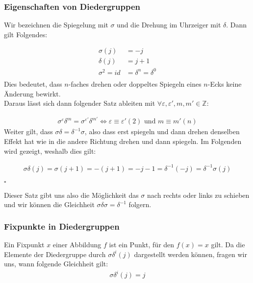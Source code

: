 \documentclass[12pt, german]{article}
\newcommand{\bewiesen}{
	
	\begin{flushright}
		$\square$  \\
\end{flushright}}
\begin{document}
\subsubsection{Eigenschaften von Diedergruppen}
	\label{sec:diederEigenschaften}
	Wir bezeichnen die Spiegelung mit $\sigma$ und die Drehung im Uhrzeiger mit $\delta$. Dann gilt Folgendes:
	
	\begin{align*}
		\sigma(j)&=-j\\
		\delta(j)&=j+1\\
		\sigma^2 = id &= \delta^n = \delta^0 \\ 	 
	\end{align*}
	Dies bedeutet, dass $n$-faches drehen oder doppeltes Spiegeln eines  $n$-Ecks keine Änderung bewirkt.  \\
	Daraus lässt sich dann folgender Satz ableiten mit $\forall \varepsilon, \varepsilon', m, m' \in \mathbb{Z}$: 
	
	\begin{align*}
		\sigma^\varepsilon\delta^m = \sigma^{\varepsilon'}\delta^{m'} \iff \varepsilon \equiv \varepsilon' (2) \text{ und } m \equiv m' (n)
	\end{align*}
	Weiter gilt, dass $\sigma\delta = \delta^{-1}\sigma$, also dass erst spiegeln und dann drehen denselben Effekt hat wie in die andere Richtung drehen und dann spiegeln. Im Folgenden wird gezeigt, weshalb dies gilt:
	
	\begin{align*}
		\sigma \delta(j) = \sigma(j+1) = -(j + 1) = -j -1 = \delta^{-1}(-j)=\delta^{-1}\sigma(j)
	\end{align*}
	\bewiesen
	Dieser Satz gibt uns also die Möglichkeit das $\sigma$ nach rechts oder links zu schieben und wir können die Gleichheit $\sigma\delta\sigma = \delta^{-1}$ folgern.

\subsubsection{Fixpunkte in Diedergruppen}
		Ein Fixpunkt $x$ einer Abbildung $f$ ist ein Punkt, für den $f(x) = x$ gilt. Da die Elemente der Diedergruppe durch $\sigma\delta^i(j)$ dargestellt werden können, fragen wir uns, wann folgende Gleichheit gilt:
		\begin{align*}
			\sigma\delta^i(j) = j
		\end{align*} 
		
\end{document}
